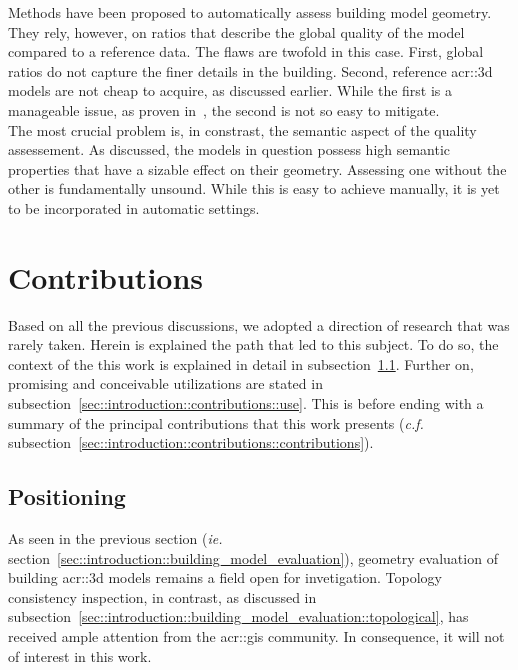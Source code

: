             Methods have been proposed to automatically assess building model geometry.
            They rely, however, on ratios that describe the global quality of the model compared to a reference data.
            The flaws are twofold in this case.
            First, global ratios do not capture the finer details in the building.
            Second, reference \gls{acr::3d} models are not cheap to acquire, as discussed earlier.
            While the first is a manageable issue, as proven in~\textcite{rottensteiner2012isprs}, the second is not so easy to mitigate.\\

            The most crucial problem is, in constrast, the semantic aspect of the quality assessement.
            As discussed, the models in question possess high semantic properties that have a sizable effect on their geometry.
            Assessing one without the other is fundamentally unsound.
            While this is easy to achieve manually, it is yet to be incorporated in automatic settings.
\section{Contributions}
    \label{sec::introduction::contributions}
    Based on all the previous discussions, we adopted a direction of research that was rarely taken.
    Herein is explained the path that led to this subject.
    To do so, the context of the this work is explained in detail in subsection~\ref{sec::introduction::contributions::positioning}.
    Further on, promising and conceivable utilizations are stated in subsection~\ref{sec::introduction::contributions::use}.
    This is before ending with a summary of the principal contributions that this work presents (\textit{c.f.} subsection~\ref{sec::introduction::contributions::contributions}).
    
    \subsection{Positioning}
        \label{sec::introduction::contributions::positioning}
        As seen in the previous section (\textit{ie.} section~\ref{sec::introduction::building_model_evaluation}), geometry evaluation of building \gls{acr::3d} models remains a field open for invetigation.
        Topology consistency inspection, in contrast, as discussed in subsection~\ref{sec::introduction::building_model_evaluation::topological}, has received ample attention from the \gls{acr::gis} community.
        In consequence, it will not of interest in this work.\\

